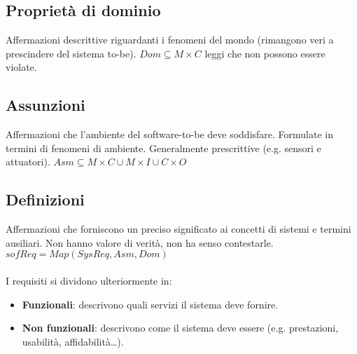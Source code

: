 \documentclass[../main.tex]{subfiles}
\begin{document}
\subsection{Proprietà di dominio}
Affermazioni descrittive riguardanti i fenomeni del mondo (rimangono veri a prescindere del sistema to-be).
$Dom\subseteq M\times C$ leggi che non possono essere violate.
\subsection{Assunzioni}
Affermazioni che l'ambiente del software-to-be deve soddisfare. Formulate in termini di fenomeni di ambiente. Generalmente prescrittive (e.g. sensori e attuatori).
$Asm\subseteq M\times C \cup M\times I \cup C \times O$
\subsection{Definizioni}
Affermazioni che forniscono un preciso significato ai concetti di sistemi e termini ausiliari.
Non hanno valore di verità, non ha senso contestarle.
$sofReq=Map(SysReq, Asm, Dom)$
\\ \\
I requisiti si dividono ulteriormente in:
\begin{itemize}
	\item \textbf{Funzionali}: descrivono quali servizi il sistema deve fornire.
	\item \textbf{Non funzionali}: descrivono come il sistema deve essere (e.g. prestazioni, usabilità, affidabilità\dots).
\end{itemize}
\end{document}

